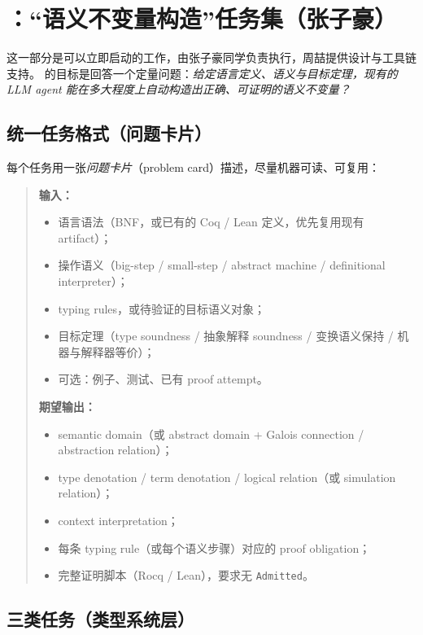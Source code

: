\section{\benchmark{}：``语义不变量构造''任务集（张子豪）}
\label{sec:benchmark}

这一部分是可以立即启动的工作，由张子豪同学负责执行，周喆提供设计与工具链支持。
\benchmark{} 的目标是回答一个定量问题：\emph{给定语言定义、语义与目标定理，现有的 LLM agent
能在多大程度上自动构造出正确、可证明的语义不变量？}

\subsection{统一任务格式（问题卡片）}

每个任务用一张\emph{问题卡片}（problem card）描述，尽量机器可读、可复用：

\begin{quote}
\noindent\textbf{输入：}
\begin{itemize}
  \item 语言语法（BNF，或已有的 Coq / Lean 定义，优先复用现有 artifact）；
  \item 操作语义（big-step / small-step / abstract machine / definitional interpreter）；
  \item typing rules，或待验证的目标语义对象；
  \item 目标定理（type soundness / 抽象解释 soundness / 变换语义保持 / 机器与解释器等价）；
  \item 可选：例子、测试、已有 proof attempt。
\end{itemize}
\noindent\textbf{期望输出：}
\begin{itemize}
  \item semantic domain（或 abstract domain + Galois connection / abstraction relation）；
  \item type denotation / term denotation / logical relation（或 simulation relation）；
  \item context interpretation；
  \item 每条 typing rule（或每个语义步骤）对应的 proof obligation；
  \item 完整证明脚本（Rocq / Lean），要求无 \texttt{Admitted}。
\end{itemize}
\end{quote}

\subsection{三类任务（类型系统层）}

